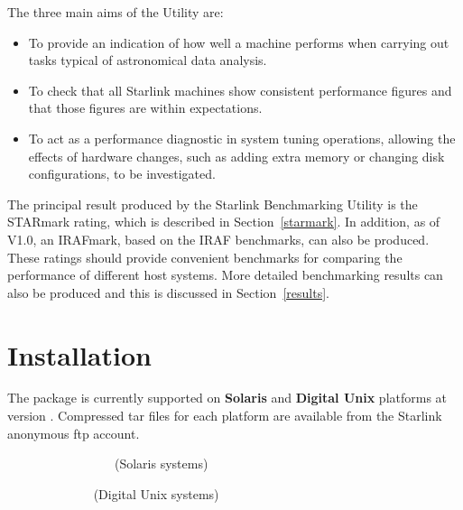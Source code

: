 The three main aims of the Utility are:

\begin{itemize}
\item To provide an indication of how well a machine performs when
carrying out tasks typical of astronomical data analysis.

\item To check that all Starlink machines show consistent performance
figures and that those figures are within expectations.

\item To act as a performance diagnostic in system tuning operations, allowing
the effects of hardware changes, such as adding extra memory or changing
disk configurations, to be investigated.
\end{itemize}

The principal result produced by the Starlink Benchmarking Utility is
the STARmark rating, which is described in Section~\ref{starmark}. In
addition, as of V1.0, an IRAFmark, based on the IRAF benchmarks, can
also be produced. These ratings should provide convenient benchmarks
for comparing the performance of different host systems. More detailed
benchmarking results can also be produced and this is discussed in
Section~\ref{results}.



\section{Installation}

The package is currently supported on {\bf Solaris} and {\bf Digital
Unix} platforms at version \pkgver. Compressed tar files for each
platform are available from the Starlink anonymous ftp account.

\vspace{3mm}
 ~~~~~~~~~~~~~~~~~(Solaris systems) 

 ~~~~~~~~~~~~~ (Digital Unix systems) 



